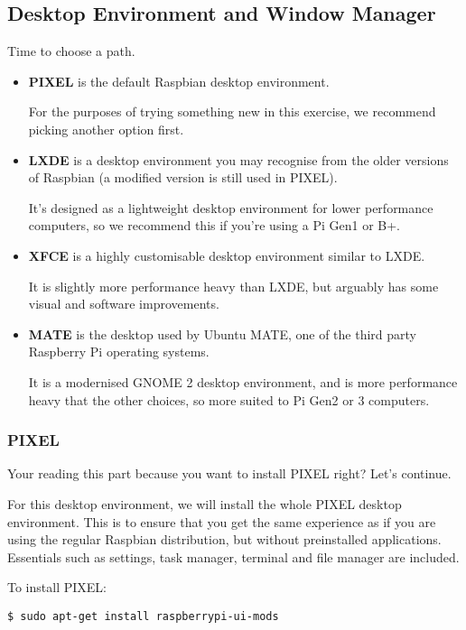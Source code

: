 	\subsection{Desktop Environment and Window Manager}
	
		Time to choose a path.
		
		\begin{itemize}
			\item \textbf{PIXEL} is the default Raspbian desktop environment.
			
			For the purposes of trying something new in this exercise, we recommend picking another option first.
			
			\item \textbf{LXDE} is a desktop environment you may recognise from the older versions of Raspbian (a modified version is still used in PIXEL).
			
			It's designed as a lightweight desktop environment for lower performance computers, so we recommend this if you're using a Pi Gen1 or B+.
			
			\item \textbf{XFCE} is a highly customisable desktop environment similar to LXDE.
			
			It is slightly more performance heavy than LXDE, but arguably has some visual and software improvements.
			
			\item \textbf{MATE} is the desktop used by Ubuntu MATE, one of the third party Raspberry Pi operating systems.
			
			It is a modernised GNOME 2 desktop environment, and is more performance heavy that the other choices, so more suited to Pi Gen2 or 3 computers.
		\end{itemize}
		
		\subsubsection*{PIXEL}
		
			Your reading this part because you want to install PIXEL right? Let's continue.
			
			For this desktop environment, we will install the whole PIXEL desktop environment. This is to ensure that you get the same experience as if you are using the regular Raspbian distribution, but without preinstalled applications. Essentials such as settings, task manager, terminal and file manager are included.
			
			To install PIXEL:
\begin{lstlisting}[breaklines=true]
$ sudo apt-get install raspberrypi-ui-mods
\end{lstlisting}
			
